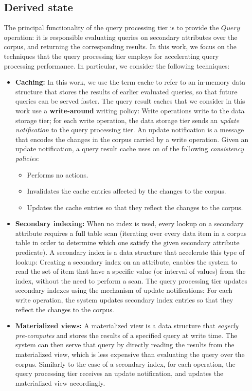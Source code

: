 \subsection{Derived state}
\label{sec:models_derived_state}
The principal functionality of the query processing tier is to provide the $Query$ operation:
it is responsible evaluating queries on secondary attributes over the corpus,
and returning the corresponding results.
In this work, we focus on the techniques that the query processing tier employs for accelerating query processing
performance.
In particular, we consider the following techniques:
\begin{itemize}
  \item \textbf{Caching:}
  In this work, we use the term cache to refer to an in-memory data structure that stores the results
  of earlier evaluated queries, so that future queries can be served faster.
  The query result caches that we consider in this work use a \textbf{write-around} writing policy:
  Write operations write to the data storage tier;
  for each write operation, the data storage tier sends an \textit{update notification} to the query processing tier.
  An update notification is a message that encodes the changes in the corpus carried by a write operation.
  Given an update notification, a query result cache uses on of the following \textit{consistency policies}:
  \begin{itemize}
    \item Performs no actions.
    \item Invalidates the cache entries affected by the changes to the corpus.
    \item Updates the cache entries so that they reflect the changes to the corpus.
  \end{itemize}
  \item \textbf{Secondary indexing:}
  When no index is used, every lookup on a secondary attribute requires a full table scan (iterating over every data item
  in a corpus table in order to determine which one satisfy the given secondary attribute predicate).
  A secondary index is a data structure that accelerate this type of lookup:
  Creating a secondary index on an attribute,
  enables the system to read the set of item that have a specific value (or interval of values) from the index,
  without the need to perform a scan.
  The query processing tier updates secondary indexes using the mechanism of update notifications:
  For each write operation, the system updates secondary index entries so that they reflect the changes to the corpus.
  \item \textbf{Materialized views:}
  A materialized view is a data structure that \textit{eagerly pre-computes} and stores the results of a specified query
  at write time.
  The system can then serve that query by directly reading the results from the materialized view,
  which is less expensive than evaluating the query over the corpus.
  Similarly to the case of a secondary index, for each operation, the query processing tier receives an update notification,
  and updates the materialized view accordingly.
\end{itemize}

